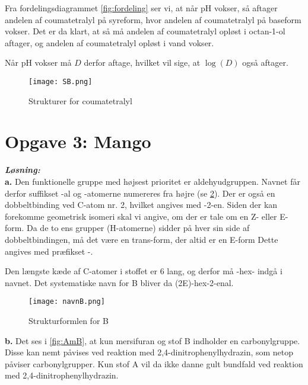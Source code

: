 \documentclass{report}
\newcommand{\sol}{\setlength{\parindent}{0cm}\textbf{\textit{Løsning:}}\setlength{\parindent}{1cm}}
\begin{document}
Fra fordelingsdiagrammet \cref{fig:fordeling} ser vi, at når pH vokser, så aftager andelen af coumatetralyl på syreform, hvor andelen af coumatetralyl på baseform vokser.
Det er da klart, at så må andelen af coumatetralyl opløst i octan-1-ol aftager, og andelen af coumatetralyl opløst i vand vokser.

Når pH vokser må $D$ derfor aftage, hvilket vil sige, at $\log\left(D\right) $ også aftager. 
\begin{figure}[H]
\begin{center}
  \texttt{[image: SB.png]}
\end{center}
\caption{Strukturer for coumatetralyl}
\label{fig:SB}
\end{figure}

\section*{Opgave 3: Mango}
\sol \\
\textbf{a.}
Den funktionelle gruppe med højsest prioritet er aldehyudgruppen.
Navnet får derfor suffikset -al og -atomerne numereres fra højre (se \cref{fig:navnB}).
Der er også en dobbeltbinding ved C-atom nr. 2, hvilket angives med -2-en.
Siden der kan forekomme geometrisk isomeri skal vi angive, om der er tale om en Z- eller E-form.
Da de to ens grupper (H-atomerne) sidder på hver sin side af dobbeltbindingen, må det være en trans-form, der altid er en E-form
Dette angives med præfikset -. 

Den længste kæde af C-atomer i stoffet er 6 lang, og derfor må -hex- indgå i navnet.
Det systematiske navn for B bliver da (2E)-hex-2-enal.

\begin{figure}[H]
\begin{center}
  \texttt{[image: navnB.png]}
\end{center}
\caption{Strukturformlen for B}
\label{fig:navnB}
\end{figure}
\noindent \textbf{b.}
Det ses i \cref{fig:AmB}, at kun mersifuran og stof B indholder en carbonylgruppe.
Disse kan nemt påvises ved reaktion med 2,4-dinitrophenylhydrazin, som netop påviser carbonylgrupper.
Kun stof A vil da ikke danne gult bundfald ved reaktion med 2,4-dinitrophenylhydrazin.
\end{document}
